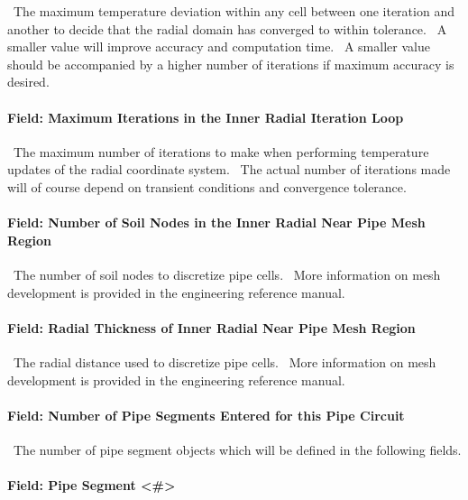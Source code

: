 ~The maximum temperature deviation within any cell between one iteration and another to decide that the radial domain has converged to within tolerance.~ A smaller value will improve accuracy and computation time.~ A smaller value should be accompanied by a higher number of iterations if maximum accuracy is desired.

\paragraph{Field: Maximum Iterations in the Inner Radial Iteration Loop}\label{field-maximum-iterations-in-the-inner-radial-iteration-loop}

~The maximum number of iterations to make when performing temperature updates of the radial coordinate system.~ The actual number of iterations made will of course depend on transient conditions and convergence tolerance.

\paragraph{Field: Number of Soil Nodes in the Inner Radial Near Pipe Mesh Region}\label{field-number-of-soil-nodes-in-the-inner-radial-near-pipe-mesh-region}

~The number of soil nodes to discretize pipe cells.~ More information on mesh development is provided in the engineering reference manual.

\paragraph{Field: Radial Thickness of Inner Radial Near Pipe Mesh Region}\label{field-radial-thickness-of-inner-radial-near-pipe-mesh-region}

~The radial distance used to discretize pipe cells.~ More information on mesh development is provided in the engineering reference manual.

\paragraph{Field: Number of Pipe Segments Entered for this Pipe Circuit}\label{field-number-of-pipe-segments-entered-for-this-pipe-circuit}

~The number of pipe segment objects which will be defined in the following fields.

\paragraph{Field: Pipe Segment \textless{}\#\textgreater{}}\label{field-pipe-segment-1-to-n-extensible}

